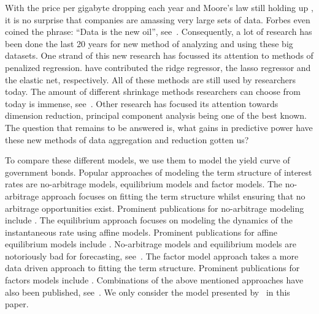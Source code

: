 With the price per gigabyte dropping each year and Moore's law still holding up \parencite{schaller_moores_1997,waldrop_chips_2016,moore_cramming_2006}, it is no surprise that companies are amassing very large sets of data. 
Forbes even coined the phrase: \enquote{Data is the new oil}, see~\textcite{bhageshpur_council_2019}. 
Consequently, a lot of research has been done the last 20 years for new method of analyzing and using these big datasets. 
One strand of this new research has focussed its attention to methods of penalized regression. 
\Textcite{bell_solutions_1978,tibshirani_regression_1996,zou_regularization_2005} have contributed the ridge regressor, the lasso regressor and the elastic net, respectively. All of these methods are still used by researchers today. 
The amount of different shrinkage methods researchers can choose from today is immense, see~\textcite{bai_forecasting_2008,bai_boosting_2009,schumacher_factor_2010,stock_generalized_2012,kim_forecasting_2014,kim_mining_2018,hirano_forecasting_2017}. 
Other research has focused its attention towards dimension reduction, principal component analysis being one of the best known. 
The question that remains to be answered is, what gains in predictive power have these new methods of data aggregation and reduction gotten us? 

To compare these different models, we use them to model the yield curve of government bonds. 
Popular approaches of modeling the term structure of interest rates are no-arbitrage models, equilibrium models and factor models. 
The no-arbitrage approach focuses on fitting the term structure whilst ensuring that no arbitrage opportunities exist. 
Prominent publications for no-arbitrage modeling include \textcite{heath_bond_1992,hull_pricing_1990}.
The equilibrium approach focuses on modeling the dynamics of the instantaneous rate using affine models.
Prominent publications for affine equilibrium models include \textcite{vasicek_equilibrium_1977,cox_theory_1985,duffie_yield-factor_1996}.
No-arbitrage models and equilibrium models are notoriously bad for forecasting, see~\textcite{duffee_term_2002}.
The factor model approach takes a more data driven approach to fitting the term structure. 
Prominent publications for factors models include \textcite{dai_specification_2000,de_jong_dynamics_1999,de_jong_time_2000,brandt_time-consistent_2003,duffee_term_2002,diebold_forecasting_2006}. 
Combinations of the above mentioned approaches have also been published, see~\textcite{christensen_arbitragefree_2009,christensen_affine_2011}.
We only consider the model presented by~\textcite{diebold_forecasting_2006} in this paper.

